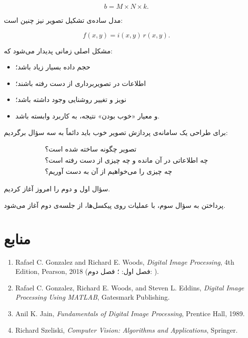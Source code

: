 \documentclass[11pt,a4paper]{article}
\begin{document}
	\[
	b=M\times N\times k.
	\]
	
	مدل ساده‌ی تشکیل تصویر نیز چنین است:
	
	\[
	f(x,y)=i(x,y)\,r(x,y).
	\]
	
	مشکل اصلی زمانی پدیدار می‌شود که:
	
	\begin{itemize}
		\item حجم داده بسیار زیاد باشد؛
		\item اطلاعات در تصویربرداری از دست رفته باشند؛
		\item نویز و تغییر روشنایی وجود داشته باشد؛
		\item و معیار «خوب بودن» نتیجه، به کاربرد وابسته باشد.
	\end{itemize}
	
	برای طراحی یک سامانه‌ی پردازش تصویر خوب باید دائماً به سه سؤال برگردیم:
	
	\[
	\boxed{
		\begin{array}{c}
			\text{تصویر چگونه ساخته شده است؟}\\
			\text{چه اطلاعاتی در آن مانده و چه چیزی از دست رفته است؟}\\
			\text{چه چیزی را می‌خواهیم از آن به دست آوریم؟}
		\end{array}
	}
	\]
	
	سؤال اول و دوم را امروز آغاز کردیم.
	
	پرداختن به سؤال سوم، با عملیات روی پیکسل‌ها، از جلسه‌ی دوم آغاز می‌شود.
	
	
	\section{منابع}
	
	\begin{enumerate}
		
		\item
		Rafael C. Gonzalez and Richard E. Woods,
		\textit{Digital Image Processing},
		4th Edition, Pearson, 2018
		(فصل اول: ؛ فصل دوم: ).
		
		\item
		Rafael C. Gonzalez, Richard E. Woods, and Steven L. Eddins,
		\textit{Digital Image Processing Using MATLAB},
		Gatesmark Publishing.
		
		\item
		Anil K. Jain,
		\textit{Fundamentals of Digital Image Processing},
		Prentice Hall, 1989.
		
		\item
		Richard Szeliski,
		\textit{Computer Vision: Algorithms and Applications},
		Springer.
		
	\end{enumerate}
	
\end{document}
